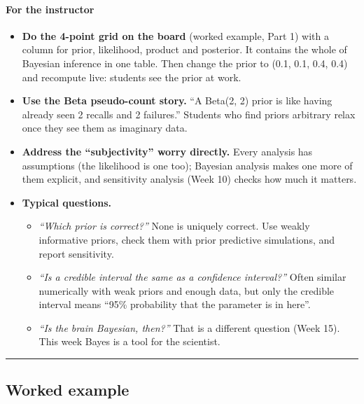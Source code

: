\paragraph{For the instructor}

\begin{itemize}
\tightlist
\item
  \textbf{Do the 4-point grid on the board} (worked example, Part 1)
  with a column for prior, likelihood, product and posterior. It
  contains the whole of Bayesian inference in one table. Then change the
  prior to (0.1, 0.1, 0.4, 0.4) and recompute live: students see the
  prior at work.
\item
  \textbf{Use the Beta pseudo-count story.} ``A Beta(2, 2) prior is like
  having already seen 2 recalls and 2 failures.'' Students who find
  priors arbitrary relax once they see them as imaginary data.
\item
  \textbf{Address the ``subjectivity'' worry directly.} Every analysis
  has assumptions (the likelihood is one too); Bayesian analysis makes
  one more of them explicit, and sensitivity analysis (Week 10) checks
  how much it matters.
\item
  \textbf{Typical questions.}

  \begin{itemize}
  \tightlist
  \item
    \emph{``Which prior is correct?''} None is uniquely correct. Use
    weakly informative priors, check them with prior predictive
    simulations, and report sensitivity.
  \item
    \emph{``Is a credible interval the same as a confidence interval?''}
    Often similar numerically with weak priors and enough data, but only
    the credible interval means ``95\% probability that the parameter is
    in here''.
  \item
    \emph{``Is the brain Bayesian, then?''} That is a different question
    (Week 15). This week Bayes is a tool for the scientist.
  \end{itemize}
\end{itemize}

\begin{center}\rule{0.5\linewidth}{0.5pt}\end{center}


\subsection{Worked example}

